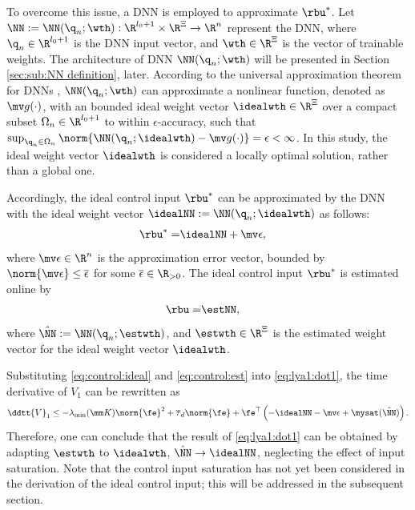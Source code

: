 \documentclass[journal]{IEEEtran}
\begin{document}
To overcome this issue, a DNN is employed to approximate $\rbu^*$.
Let $\NN:=\NN({\q}_n;\wth): \R^{l_0+1}\times\R^{\Xi}\to\R^{n}$ represent the DNN, where ${\q}_n\in\R^{l_0+1}$ is the DNN input vector, and $\wth\in\R^{\Xi}$ is the vector of trainable weights.
The architecture of DNN $\NN({\q}_n;\wth)$ will be presented in Section \ref{sec:sub:NN definition}, later.
According to the universal approximation theorem for DNNs \cite{Kidger:2020aa}, $\NN({\q}_n;\wth)$ can approximate a nonlinear function, denoted as $\mv g(\cdot)$, with an bounded ideal weight vector $\idealwth\in\R^\Xi$ over a compact subset $\Omega_{n}\in\R^{l_0+1}$ to within $\epsilon$-accuracy, such that $\sup_{{\q}_n\in\Omega_{n}}\norm{ \NN({\q}_n;\idealwth) - \mv g(\cdot)} = \epsilon < \infty$.
In this study, the ideal weight vector $\idealwth$ is considered a locally optimal solution, rather than a global one.

Accordingly, the ideal control input $\rbu^*$ can be approximated by the DNN with the ideal weight vector $\idealNN:=\NN({\q}_n;\idealwth)$ as follows:
\begin{align}
    \rbu^*=& \idealNN+\mv\epsilon
    ,
    \label{eq:control:ideal}
\end{align}
where $\mv\epsilon\in\R^n$ is the approximation error vector, bounded by $\norm{\mv\epsilon}\le \overline{\epsilon}$ for some $\overline{\epsilon}\in\R_{>0}$.
The ideal control input $\rbu^*$ is estimated online by
\begin{align}
    \rbu =& \estNN,
    \label{eq:control:est}
\end{align}
where $\hat\NN:=\NN({\q}_n;\estwth)$, and $\estwth\in\R^\Xi$ is the estimated weight vector for the ideal weight vector $\idealwth$.

Substituting \eqref{eq:control:ideal} and \eqref{eq:control:est} into \eqref{eq:lya1:dot1}, the time derivative of $V_1$ can be rewritten as
\begin{equation}
    \ddtt{V}_1
    \le 
    -\lambda_{\min}(\mm K)\norm{\fe}^2
    +
    \overline\tau_d\norm{\fe}
    +
    \fe^\top 
    \left(
        -\idealNN
        -\mv\epsilon
        +\mysat(\hat\NN)
    \right)
    .
    \label{eq:lya1:dot2}
\end{equation}
Therefore, one can conclude that the result of \eqref{eq:lya1:dot1} can be obtained by adapting $\estwth$ to $\idealwth$, \ie $\hat\NN\to\idealNN$, neglecting the effect of input saturation.
Note that the control input saturation has not yet been considered in the derivation of the ideal control input; this will be addressed in the subsequent section.
\end{document}
